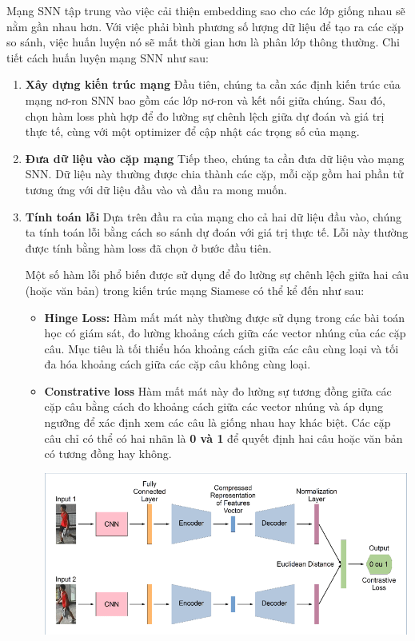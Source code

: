 \documentclass[a4paper, 12pt, openany]{book}
\begin{document}
Mạng SNN tập trung vào việc cải thiện embedding sao cho các lớp giống nhau sẽ nằm gần nhau hơn. Với việc phải bình phương số lượng dữ liệu để tạo ra các cặp so sánh, việc huấn luyện nó sẽ mất thời gian hơn là phân lớp thông thường.
Chi tiết cách huấn luyện mạng SNN như sau:

\begin{enumerate}
    \item \textbf{Xây dựng kiến trúc mạng}  Đầu tiên, chúng ta cần xác định kiến trúc của mạng nơ-ron SNN bao gồm các lớp nơ-ron và kết nối giữa chúng. Sau đó, chọn hàm loss phù hợp để đo lường sự chênh lệch giữa dự đoán và giá trị thực tế, cùng với một optimizer để cập nhật các trọng số của mạng.
    \item \textbf{Đưa dữ liệu vào cặp mạng} Tiếp theo, chúng ta cần đưa dữ liệu vào mạng SNN. Dữ liệu này thường được chia thành các cặp, mỗi cặp gồm hai phần tử tương ứng với dữ liệu đầu vào và đầu ra mong muốn.
    \item \textbf{Tính toán lỗi}  Dựa trên đầu ra của mạng cho cả hai dữ liệu đầu vào, chúng ta tính toán lỗi bằng cách so sánh dự đoán với giá trị thực tế. Lỗi này thường được tính bằng hàm loss đã chọn ở bước đầu tiên.
    
        Một số hàm lỗi phổ biến được sử dụng để đo lường sự chênh lệch giữa hai câu (hoặc văn bản) trong kiến trúc mạng Siamese có thể kể đến như sau:    
        \begin{itemize}
            \item \textbf{Hinge Loss:}  Hàm mất mát này thường được sử dụng trong các bài toán học có giám sát, đo lường khoảng cách giữa các vector nhúng của các cặp câu. Mục tiêu là tối thiểu hóa khoảng cách giữa các câu cùng loại và tối đa hóa khoảng cách giữa các cặp câu không cùng loại.
            \item \textbf{Constrative loss} Hàm mất mát này đo lường sự tương đồng giữa các cặp câu bằng cách đo khoảng cách giữa các vector nhúng và áp dụng ngưỡng để xác định xem các câu là giống nhau hay khác biệt.
            Các cặp câu chỉ có thể có hai nhãn là \textbf{0 và 1} để quyết định hai câu hoặc văn bản có tương đồng hay không.

            \begin{minipage}{\linewidth}
                \captionsetup{type=figure}
                \centering
                \includegraphics[width=12cm]{./assets/images/siamese-cnn.png}
            \end{minipage}


\end{itemize}
\end{enumerate}
\end{document}

